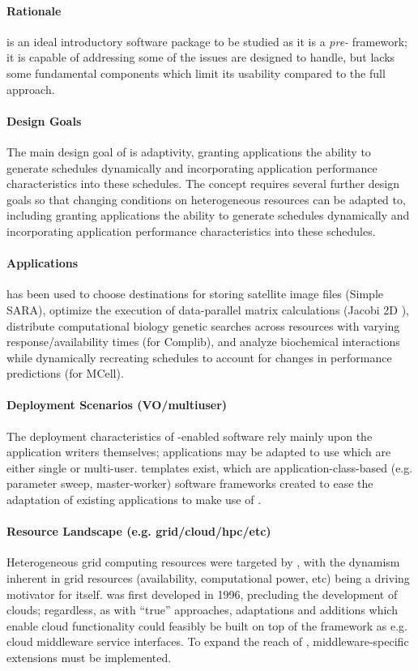 \documentclass{sig-alternate}
\begin{document}
\paragraph{Rationale}
\apples is an ideal introductory software package to be studied
as it is a \textit{pre-\pilot} framework; it is capable of
addressing some of the issues \pilotjobs are designed to handle,
but lacks some fundamental components which limit its usability
compared to the full \pilotjob approach.

\paragraph{Design Goals}
The main design goal of \apples is adaptivity, granting applications
the ability to generate schedules dynamically and incorporating
application performance characteristics into these schedules.
The concept requires several further
design goals so that changing conditions on heterogeneous
resources can be adapted to, including granting applications
the ability to generate schedules dynamically and incorporating
application performance characteristics into these schedules.

\paragraph{Applications}
\apples has been used to choose destinations
for storing satellite image files (Simple SARA),
optimize the execution of data-parallel matrix
calculations (Jacobi 2D \apples),
distribute computational biology genetic searches
across resources with varying response/availability times
(\apples for Complib), and
analyze biochemical interactions while dynamically recreating
schedules to account for changes in performance predictions
(\apples for MCell).

\paragraph{Deployment Scenarios (VO/multiuser)}
The deployment characteristics of \apples-enabled software rely
mainly upon the application writers themselves; applications
may be adapted to use \apples which are either single or multi-user.
\apples templates exist, which are application-class-based (e.g.
parameter sweep, master-worker)
software frameworks created
to ease the adaptation of existing applications to make use
of \apples.

\paragraph{Resource Landscape (e.g. grid/cloud/hpc/etc)}
Heterogeneous grid computing resources were targeted by
\apples, with the dynamism inherent in grid resources (availability,
computational power, etc) being a driving
motivator for \apples itself.  \apples
was first developed in 1996, precluding the development of clouds;
regardless, as with ``true'' \pilotjob approaches, adaptations
and additions which enable cloud functionality could
feasibly be built on top of the \apples framework as e.g.
cloud middleware service interfaces.
 To expand the reach of \apples, middleware-specific
extensions must be implemented.
\end{document}
